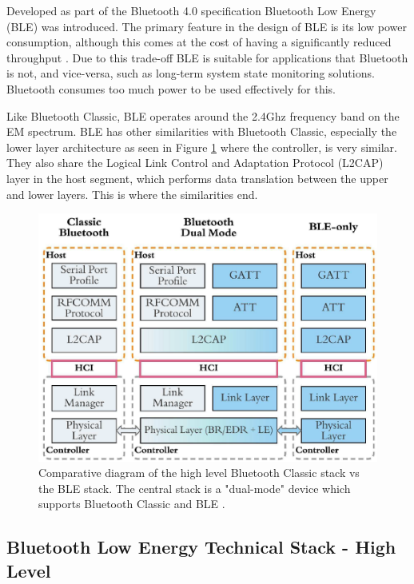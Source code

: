 \documentclass{l4proj}
\begin{document}
Developed as part of the Bluetooth 4.0 specification Bluetooth Low Energy (BLE) was introduced. The primary feature in the design of BLE is its low power consumption, although this comes at the cost of having a significantly reduced throughput \citep{gomez_overview_2012}. Due to this trade-off BLE is suitable for applications that Bluetooth is not, and vice-versa, such as long-term system state monitoring solutions. Bluetooth consumes too much power to be used effectively for this.

Like Bluetooth Classic, BLE operates around the 2.4Ghz frequency band on the EM spectrum. BLE has other similarities with Bluetooth Classic, especially the lower layer architecture as seen in Figure \ref{fig:bluetooth_stack_comparison} where the controller, is very similar. They also share the Logical Link Control and Adaptation Protocol (L2CAP) layer in the host segment, which performs data translation between the upper and lower layers. This is where the similarities end.

\begin{figure}[!htb]
    \centering
    \includegraphics[width=0.8\linewidth]{images/bluetooth_stacks.png}

    \caption{ Comparative diagram of the high level Bluetooth Classic stack vs the BLE stack. The central stack is a "dual-mode" device which supports Bluetooth Classic and BLE \citep{yang_beyond_2020}. }

    \label{fig:bluetooth_stack_comparison}
\end{figure}

\subsection{Bluetooth Low Energy Technical Stack - High Level}
\end{document}
